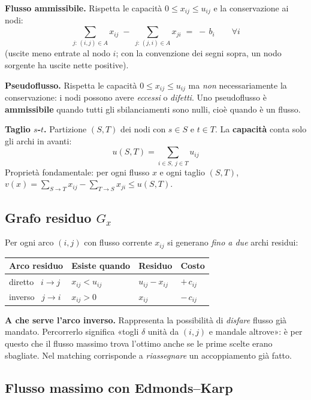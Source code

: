 \documentclass[11pt,a4paper]{article}
\begin{document}
\textbf{Flusso ammissibile.} Rispetta le capacità $0 \le x_{ij} \le u_{ij}$
e la conservazione ai nodi:
\[ \sum_{j :\, (i,j) \in A} x_{ij} \;-\; \sum_{j :\, (j,i) \in A} x_{ji} \;=\; -\,b_i \qquad \forall i \]
(uscite meno entrate al nodo $i$; con la convenzione dei segni sopra, un nodo sorgente
ha uscite nette positive).

\textbf{Pseudoflusso.} Rispetta le capacità $0\le x_{ij}\le u_{ij}$ ma \emph{non}
necessariamente la conservazione: i nodi possono avere \emph{eccessi} o \emph{difetti}.
Uno pseudoflusso è \textbf{ammissibile} quando tutti gli sbilanciamenti sono nulli,
cioè quando è un flusso.

\textbf{Taglio $s$-$t$.} Partizione $(S, T)$ dei nodi con $s \in S$ e $t \in T$.
La \textbf{capacità} conta solo gli archi in avanti:
\[ u(S,T) = \sum_{i \in S,\ j \in T} u_{ij} \]
Proprietà fondamentale: per ogni flusso $x$ e ogni taglio $(S,T)$,
$v(x) = \sum_{S\to T} x_{ij} - \sum_{T \to S} x_{ji} \le u(S,T)$.

\subsection{Grafo residuo $G_x$}

Per ogni arco $(i,j)$ con flusso corrente $x_{ij}$ si generano \emph{fino a due} archi residui:

\begin{center}
\begin{tabular}{@{}p{3.6cm} p{3.9cm} p{2.8cm} p{3.0cm}@{}}
\toprule
\textbf{Arco residuo} & \textbf{Esiste quando} & \textbf{Residuo} & \textbf{Costo}\\
\midrule
diretto \ $i \to j$ & $x_{ij} < u_{ij}$ & $u_{ij} - x_{ij}$ & $+\,c_{ij}$\\
\addlinespace
inverso \ $j \to i$ & $x_{ij} > 0$ & $x_{ij}$ & $-\,c_{ij}$\\
\bottomrule
\end{tabular}
\end{center}

\begin{idea}
\textbf{A che serve l'arco inverso.} Rappresenta la possibilità di \emph{disfare} flusso già
mandato. Percorrerlo significa «togli $\delta$ unità da $(i,j)$ e mandale altrove»: è per questo
che il flusso massimo trova l'ottimo anche se le prime scelte erano sbagliate.
Nel matching corrisponde a \emph{riassegnare} un accoppiamento già fatto.
\end{idea}

\newpage
\subsection{Flusso massimo con Edmonds--Karp}
\end{document}
